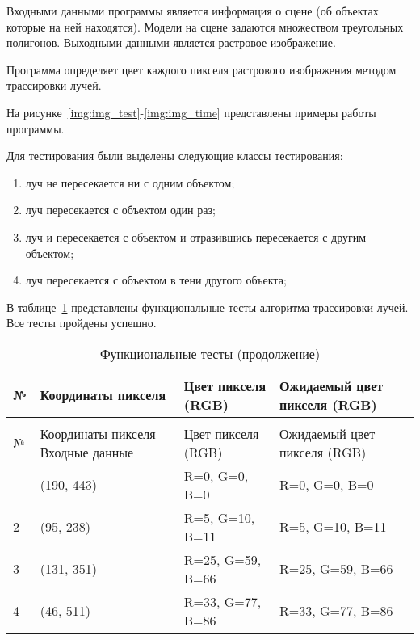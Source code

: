 Входными данными программы является информация о сцене (об объектах которые на ней находятся). Модели на сцене задаются множеством треугольных полигонов. Выходными данными является растровое изображение.

Программа определяет цвет каждого пикселя растрового изображения методом трассировки лучей.

На рисунке~\ref{img:img_test}-\ref{img:img_time} представлены примеры работы программы.



Для тестирования были выделены следующие классы тестирования:
\begin{enumerate}
	\item {луч не пересекается ни с одним объектом};
	\item {луч пересекается с объектом один раз};
	\item {луч и пересекается с объектом и отразившись пересекается с другим объектом};
	\item {луч пересекается с объектом в тени другого объекта};
\end{enumerate}

В таблице~\ref{tbl:tests} представлены функциональные тесты алгоритма трассировки лучей. Все тесты пройдены успешно.


\begin{longtable}{|p{}|p{}|p{}|p{}|}
	\caption{Функциональные тесты}\label{tbl:tests} \\\hline
	№ & Координаты пикселя  & Цвет пикселя (RGB) & Ожидаемый цвет пикселя (RGB)                                          \\\hline
	\endfirsthead
	\caption{Функциональные тесты (продолжение)} \\\hline
	№ & Координаты пикселя Входные данные & Цвет пикселя (RGB) & Ожидаемый цвет пикселя (RGB)                                                 \\\hline
	\endhead
	\endfoot
	1 & (190, 443) & R=0, G=0, B=0 & R=0, G=0, B=0 \\ \hline
	2 & (95, 238) & R=5, G=10, B=11 & R=5, G=10, B=11 \\ \hline
	3 & (131, 351) & R=25, G=59, B=66 &  R=25, G=59, B=66 \\ \hline
	4 & (46, 511) & R=33, G=77, B=86 & R=33, G=77, B=86 \\ \hline
\end{longtable}


\clearpage
